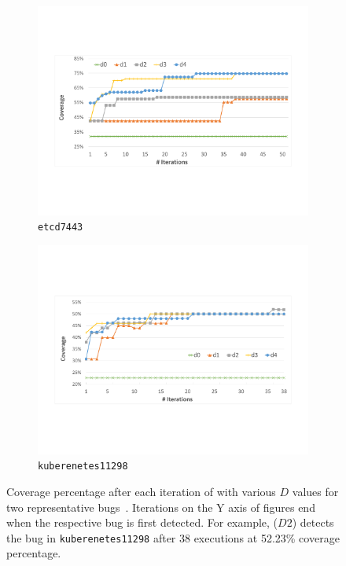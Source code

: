 \begin{figure}
     \centering
     \begin{subfigure}[b]{0.46\textwidth}
        \centering
        \includegraphics[width=\textwidth]{figs/coverage_etcd7443.pdf}
        \caption{\texttt{etcd7443}}
        \label{fig:etcd_coverage}
     \end{subfigure}
     \hfill
     \begin{subfigure}[b]{0.46\textwidth}
       \centering
       \includegraphics[width=\textwidth]{figs/coverage_kubernetes11298.pdf}
       \caption{\texttt{kuberenetes11298}}
       \label{fig:kubernetes_coverage}
     \end{subfigure}
        \caption{Coverage percentage after each iteration of \goat with various $D$ values for two representative bugs~\cite{yuan-gobench-cgo21}. Iterations on the Y axis of figures end when the respective bug is first detected. For example, \goat($D2$) detects the bug in \texttt{kuberenetes11298} after 38 executions at 52.23\% coverage percentage.}
        \label{fig:coverage}
\end{figure}



